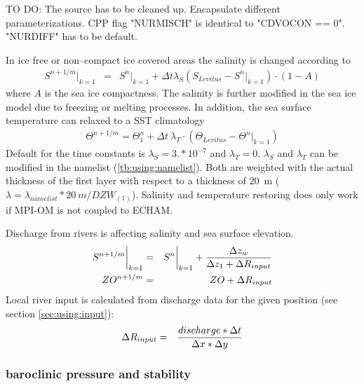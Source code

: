 TO DO: The source has to be cleaned up. Encapsulate different parameterizations. 
CPP flag "NURMISCH" is identical to "CDVOCON == 0".  "NURDIFF" has to be default.

In ice free or non--compact ice covered areas the salinity is changed according to
\begin{eqnarray}
S^{n+1/m}\bigg\vert_{k=1}& = &S^n\bigg\vert_{k=1} + \Delta t\lambda_{S}\left(
                 S_{Levitus} - S^n\bigg\vert_{k=1}\right)\cdot (1-A)
\end{eqnarray}
where $A$ is the sea ice compactness. The salinity is further modified
in the sea ice model due to freezing or melting processes.
In addition, the sea surface temperature can relaxed to a SST climatology \citep{Levitus:1998}
\begin{eqnarray}
\Theta^{n+1/m}=\Theta_1^n + \Delta t \: \lambda_T\cdot(\Theta_{Levitus}-\Theta^n\bigg\vert_{k=1})
\end{eqnarray}
Default for the time constants is $\lambda_{S} = 3.*10^{-7}$ and $\lambda_{T} = 0.$ 
$\lambda_{S}$ and $\lambda_{T}$ can be modified in the namelist (\ref{tb:using:namelist}).
Both are weighted with the actual thickness of the first layer with respect to a thickness of 20~m
($\lambda = \lambda_{namelist}*20~m/DZW_{(1)}$).
Salinity and temperature restoring does only work if MPI-OM is not coupled to ECHAM. 
 
\clearpage
 
Discharge from rivers is affecting salinity and sea surface elevation. 
\begin{eqnarray}
S^{n+1/m}\bigg\vert_{k=1}& = &S^n\bigg\vert_{k=1} + {{\Delta z_{w}}\over{\Delta z_{1} + \Delta R_{input}}}\\
ZO^{n+1/m}& = &ZO + \Delta R_{input}\\
\end{eqnarray}
Local river input is calculated from discharge data for the given position (see section \ref{sec:using:input}):
\begin{eqnarray}
\Delta R_{input}& = &{{discharge*\Delta t}\over{\Delta x*\Delta y}}
\end{eqnarray}
 


\subsubsection{baroclinic pressure and stability}


